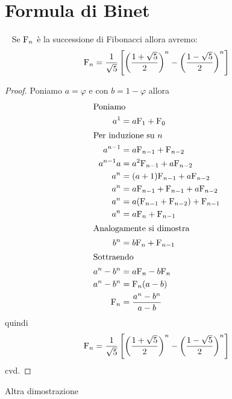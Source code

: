 \section{Formula di Binet}
\begin{thm}~\cite{Conti2020}\label{thm:FibFormulaBinet}
	Se $\mathrm{F}_{n}$ è la successione di Fibonacci allora avremo:
	\begin{equation}
		\mathrm{F}_{n}=\dfrac{1}{\sqrt{5}}\left[\left(\dfrac{1+\sqrt{5}}{2}\right)^n-\left(\dfrac{1-\sqrt{5}}{2}\right)^n\right]
	\end{equation}\label{eqn:FinBinet}
\end{thm}
\begin{proof}
	Poniamo $a=\varphi$ e con $b=1-\varphi$ allora
	\begin{align*}
		\intertext{Poniamo}
		a^1={}      & a\mathrm{F}_{1}+\mathrm{F}_{0}                 \\
		\intertext{Per induzione su $n$}
		a^{n-1}={}  & a\mathrm{F}_{n-1}+\mathrm{F}_{n-2}             \\
		a^{n-1}a={} & a^2\mathrm{F}_{n-1}+a\mathrm{F}_{n-2}          \\
		a^{n}={}    & (a+1)\mathrm{F}_{n-1}+a\mathrm{F}_{n-2}        \\
		a^{n}={}    & a\mathrm{F}_{n-1}+\mathrm{F}_{n-1}+a\mathrm{F}_{n-2}  \\
		a^{n}={}    & a(\mathrm{F}_{n-1}+\mathrm{F}_{n-2})+\mathrm{F}_{n-1} \\
		a^{n}={}    & a\mathrm{F}_{n}+\mathrm{F}_{n-1}               \\
		\intertext{Analogamente si dimostra}
		b^{n}={}    & b\mathrm{F}_{n}+\mathrm{F}_{n-1}               \\
		\intertext{Sottraendo}
		a^n-b^n={}  & a\mathrm{F}_{n}-b\mathrm{F}_{n}                \\
		a^n-b^n={}  & \mathrm{F}_{n}(a-b)                     \\
		\mathrm{F}_{n}={}  & \dfrac{a^n-b^n}{a-b}
	\end{align*}
	quindi
	\begin{equation}
		\mathrm{F}_{n}=\dfrac{1}{\sqrt{5}}\left[\left(\dfrac{1+\sqrt{5}}{2}\right)^n-\left(\dfrac{1-\sqrt{5}}{2}\right)^n\right]
	\end{equation}
	cvd.
\end{proof}
Altra dimostrazione
